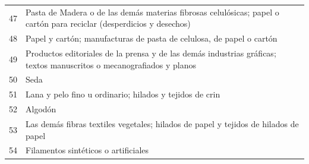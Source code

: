 \documentclass[a4paper,openright,12pt]{book}
\begin{document}
\begin{table}[]
{\begin{tabular}{@{}ll@{}}
    47  & Pasta de Madera o de las demás materias fibrosas celulósicas; papel o cartón para reciclar (desperdicios y desechos)                                                                                                                                                                           \\
    48  & Papel y cartón; manufacturas de pasta de celulosa, de papel o cartón                                                                                                                                                                                                                           \\
    49  & Productos editoriales de la prensa y de las demás industrias gráficas; textos manuscritos o mecanografiados y planos                                                                                                                                                                           \\
    50  & Seda                                                                                                                                                                                                                                                                                           \\
    51  & Lana y pelo fino u ordinario; hilados y tejidos de crin                                                                                                                                                                                                                                        \\
    52  & Algodón                                                                                                                                                                                                                                                                                        \\
    53  & Las demás fibras textiles vegetales; hilados de papel y tejidos de hilados de papel                                                                                                                                                                                                            \\
    54  & Filamentos sintéticos o artificiales                                                                                                                                                                                                                                                           \\

\end{tabular}}
\end{table}
\end{document}
